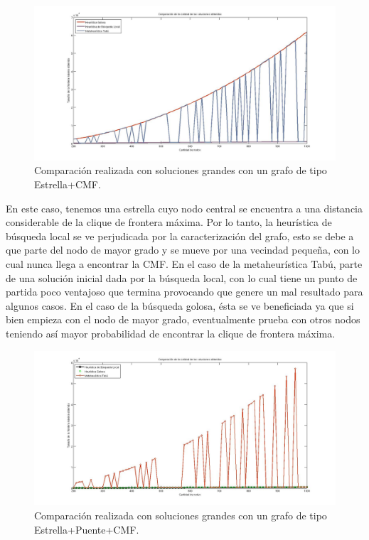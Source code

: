  \begin{figure}[H] %
\begin{center}
\includegraphics[width=500pt]{../imgs/calidadSolucionesGrandes15.jpg}
\caption{Comparación realizada con soluciones grandes con un grafo de tipo Estrella+CMF.}
\end{center}
\end{figure}

En este caso, tenemos una estrella cuyo nodo central se encuentra a una distancia considerable de la clique de frontera máxima. Por lo tanto, la heurística de búsqueda local se ve perjudicada por la caracterización del grafo, esto se debe a que parte del nodo de mayor grado y se mueve por una vecindad pequeña, con lo cual nunca llega a encontrar la CMF. En el caso de la metaheurística Tabú, parte de una solución inicial dada por la búsqueda local, con lo cual tiene un punto de partida poco ventajoso que termina provocando que genere un mal resultado para algunos casos. En el caso de la búsqueda golosa, ésta se ve beneficiada ya que si bien empieza con el nodo de mayor grado, eventualmente prueba con otros nodos teniendo así mayor probabilidad de encontrar la clique de frontera máxima. 

 \begin{figure}[H] %
\begin{center}
\includegraphics[width=500pt]{../imgs/calidadSolucionesGrandes14.jpg}
\caption{Comparación realizada con soluciones grandes con un grafo de tipo Estrella+Puente+CMF.}
\end{center}
\end{figure}

